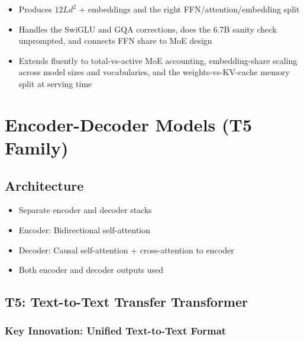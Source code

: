 \begin{interviewq}
\goodgreat
\begin{itemize}
    \item {} Produces $12Ld^2$ + embeddings and the right FFN/attention/embedding split
    \item {} Handles the SwiGLU and GQA corrections, does the 6.7B sanity check unprompted, and connects FFN share to MoE design
    \item {} Extends fluently to total-vs-active MoE accounting, embedding-share scaling across model sizes and vocabularies, and the weights-vs-KV-cache memory split at serving time
\end{itemize}

\end{interviewq}

\section{Encoder-Decoder Models (T5 Family)}
\label{sec:encoder_decoder}

\subsection{Architecture}

\begin{itemize}
    \item Separate encoder and decoder stacks
    \item Encoder: Bidirectional self-attention
    \item Decoder: Causal self-attention + cross-attention to encoder
    \item Both encoder and decoder outputs used
\end{itemize}

\subsection{T5: Text-to-Text Transfer Transformer}

\subsubsection{Key Innovation: Unified Text-to-Text Format}

